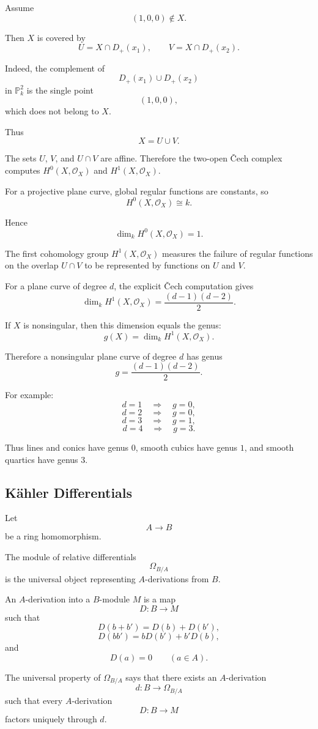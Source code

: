 \documentclass[12pt,a4paper]{article}
\theoremstyle{notespace}
\begin{document}
Assume
\[
(1,0,0)\notin X.
\]

Then $X$ is covered by
\[
U=X\cap D_+(x_1),
\qquad
V=X\cap D_+(x_2).
\]

Indeed, the complement of
\[
D_+(x_1)\cup D_+(x_2)
\]
in $\mathbb P_k^2$ is the single point
\[
(1,0,0),
\]
which does not belong to $X$.

Thus
\[
X=U\cup V.
\]

The sets $U$, $V$, and $U\cap V$ are affine. Therefore the two-open
\v{C}ech complex computes $H^0(X,\mathcal O_X)$ and
$H^1(X,\mathcal O_X)$.

For a projective plane curve, global regular functions are constants, so
\[
H^0(X,\mathcal O_X)\cong k.
\]

Hence
\[
\dim_k H^0(X,\mathcal O_X)=1.
\]

The first cohomology group $H^1(X,\mathcal O_X)$ measures the failure of
regular functions on the overlap $U\cap V$ to be represented by functions on
$U$ and $V$.

For a plane curve of degree $d$, the explicit \v{C}ech computation gives
\[
\dim_k H^1(X,\mathcal O_X)
=
\frac{(d-1)(d-2)}2.
\]

If $X$ is nonsingular, then this dimension equals the genus:
\[
g(X)=\dim_k H^1(X,\mathcal O_X).
\]

Therefore a nonsingular plane curve of degree $d$ has genus
\[
\boxed{
	g=\frac{(d-1)(d-2)}2.
}
\]

For example:
\[
d=1\quad\Rightarrow\quad g=0,
\]
\[
d=2\quad\Rightarrow\quad g=0,
\]
\[
d=3\quad\Rightarrow\quad g=1,
\]
\[
d=4\quad\Rightarrow\quad g=3.
\]

Thus lines and conics have genus $0$, smooth cubics have genus $1$, and
smooth quartics have genus $3$.

\subsection{K\"ahler Differentials}

Let
\[
A\to B
\]
be a ring homomorphism.

The module of relative differentials
\[
\Omega_{B/A}
\]
is the universal object representing $A$-derivations from $B$.

An $A$-derivation into a $B$-module $M$ is a map
\[
D:B\to M
\]
such that
\[
D(b+b')=D(b)+D(b'),
\]
\[
D(bb')=bD(b')+b'D(b),
\]
and
\[
D(a)=0
\qquad
(a\in A).
\]

The universal property of $\Omega_{B/A}$ says that there exists an
$A$-derivation
\[
d:B\to\Omega_{B/A}
\]
such that every $A$-derivation
\[
D:B\to M
\]
factors uniquely through $d$.
\end{document}
